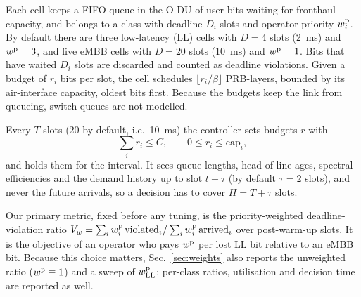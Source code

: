 \documentclass[conference]{IEEEtran}
\begin{document}
Each cell keeps a FIFO queue in the O-DU of user bits waiting for fronthaul capacity, and belongs to a class with deadline $D_i$ slots and operator priority $w_i^{\rm p}$. By default there are three low-latency (LL) cells with $D = 4$ slots (2~ms) and $w^{\rm p} = 3$, and five eMBB cells with $D = 20$ slots (10~ms) and $w^{\rm p} = 1$. Bits that have waited $D_i$ slots are discarded and counted as deadline violations. Given a budget of $r_i$ bits per slot, the cell schedules $\lfloor r_i/\beta \rfloor$ PRB-layers, bounded by its air-interface capacity, oldest bits first. Because the budgets keep the link from queueing, switch queues are not modelled.

Every $T$ slots (20 by default, i.e.\ 10~ms) the controller sets budgets $r$ with
\begin{equation}
\textstyle\sum_i r_i \le C, \qquad 0 \le r_i \le \mathrm{cap}_i ,
\label{eq:feasible}
\end{equation}
and holds them for the interval. It sees queue lengths, head-of-line ages, spectral efficiencies and the demand history up to slot $t-\tau$ (by default $\tau = 2$ slots), and never the future arrivals, so a decision has to cover $H = T + \tau$ slots.

Our primary metric, fixed before any tuning, is the priority-weighted deadline-violation ratio $V_w = \sum_i w_i^{\rm p}\, \mathrm{violated}_i \big/ \sum_i w_i^{\rm p}\, \mathrm{arrived}_i$ over post-warm-up slots. It is the objective of an operator who pays $w^{\rm p}$ per lost LL bit relative to an eMBB bit. Because this choice matters, Sec.~\ref{sec:weights} also reports the unweighted ratio ($w^{\rm p} \equiv 1$) and a sweep of $w^{\rm p}_{\rm LL}$; per-class ratios, utilisation and decision time are reported as well.
\end{document}
